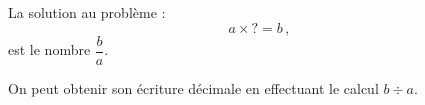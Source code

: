 La solution au problème :$$a\times?=b\,,$$est le nombre $\dfrac{b}{a}$.\par\noindent
On peut obtenir son écriture décimale en effectuant le calcul $b\div a$.